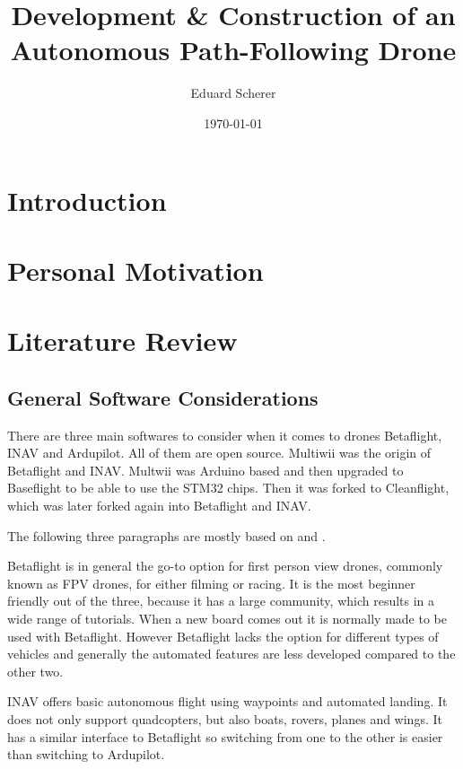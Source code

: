 \documentclass{article}
\author{Eduard Scherer}
\title{Development \& Construction of an Autonomous Path-Following Drone}
\date{\today}
\newcommand{\comment}[1]{}
\begin{document}
\maketitle
\tableofcontents
	\section{Introduction}

	\section{Personal Motivation}
	\comment{rather short}
	\section{Literature Review}
	\subsection{General Software Considerations}
	
	There are three main softwares to consider when it comes to drones Betaflight, INAV and Ardupilot. All of them are open source. Multiwii was the origin of Betaflight and INAV. Multwii was Arduino based and then upgraded to Baseflight to be able to use the STM32 chips. Then it was forked to Cleanflight, which was later forked again into Betaflight and INAV\cite{history}. 
	
	The following three paragraphs are mostly based on \cite{firmwarearticle} and \cite{firmwarevideo}.
	
	Betaflight is in general the go-to option for first person view drones, commonly known as FPV drones, for either filming or racing. It is the most beginner friendly out of the three, because it has a large community, which results in a wide range of tutorials. When a new board comes out it is normally made to be used with Betaflight. However Betaflight lacks the option for different types of vehicles and generally the automated features are less developed compared to the other two. 
	
	INAV offers basic autonomous flight using waypoints and automated landing. It does not only support quadcopters, but also boats, rovers, planes and wings. It has a similar interface to Betaflight so switching from one to the other is easier than switching to Ardupilot.
	
\end{document}
